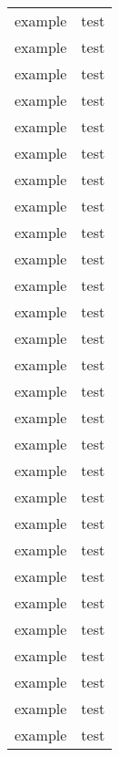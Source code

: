 \documentclass[a4paper, 11pt]{article}
\begin{document}
\begin{CJK*}{GBK}{song}
\begin{longtable}{|c|c|}
example & test \\
example & test \\
example & test \\
example & test \\
example & test \\
example & test \\
example & test \\
example & test \\
example & test \\
example & test \\
example & test \\
example & test \\
example & test \\
example & test \\
example & test \\
example & test \\
example & test \\
example & test \\
example & test \\
example & test \\
example & test \\
example & test \\
example & test \\
example & test \\
example & test \\
example & test \\
example & test \\
example & test \\
\hline
\end{longtable}
\end{CJK*}
\end{document}
